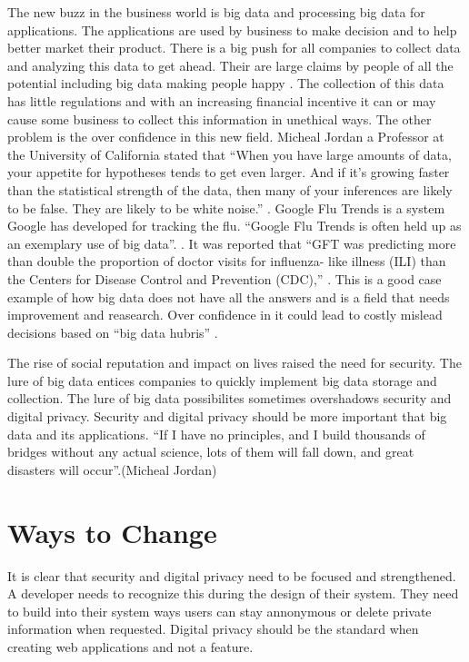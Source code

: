 \documentclass[12pt]{article}
\begin{document}
The new buzz in the business world is big data and processing big data for applications. The applications are used by business to make decision and to help better market their product. There is a big push for all companies to collect data and analyzing this data to get ahead. Their are large claims by people of all the potential including big data making people happy \cite{Banayan}. The collection of this data has little regulations and with an increasing financial incentive it can or may cause some business to collect this information in unethical ways. The other problem is the over confidence in this new field. Micheal Jordan a Professor at the University of California stated that ``When you have large amounts of data, your appetite for hypotheses tends to get even larger. And if it’s growing faster than the statistical strength of the data, then many of your inferences are likely to be false. They are likely to be white noise.'' \cite{Gomes}. Google Flu Trends is a system Google has developed for tracking the flu. ``Google Flu Trends is often held 
up as an exemplary use of big data''. \cite{Lazer}. It was reported that ``GFT was predicting more than double the proportion of doctor visits for influenza- like illness (ILI) than the Centers for Disease Control and Prevention (CDC),'' \cite{Lazer}. This is a good case example of how big data does not have all the answers and is a field that needs improvement and reasearch. Over confidence in it could lead to costly mislead decisions based on ``big data hubris'' \cite{Lazer}.

The rise of social reputation and impact on lives raised the need for security. The lure of big data entices companies to quickly implement big data storage and collection. The lure of big data possibilites sometimes overshadows security and digital privacy. Security and digital privacy should be more important that big data and its applications. ``If I have no principles, and I build thousands of bridges without any actual science, lots of them will fall down, and great disasters will occur''.(Micheal Jordan)\cite{Gomes}

\section{Ways to  Change}\label{sec:developers}
It is clear that security and digital privacy need to be focused and strengthened. A developer needs to recognize this during the design of their system. They need to build into their system ways users can stay annonymous or delete private information when requested. Digital privacy should be the standard when creating web applications and not a feature.
\end{document}
